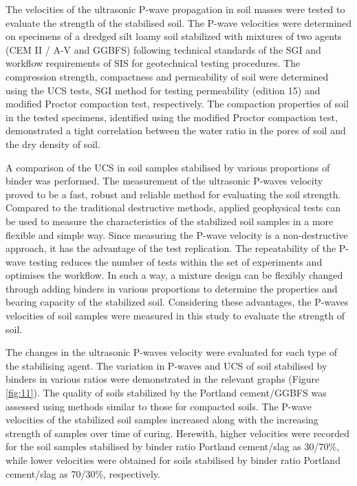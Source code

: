 \documentclass{amestyle}
\begin{document}
The velocities of the ultrasonic P-wave propagation in soil masses were tested to evaluate the strength of the stabilised soil. The P-wave velocities were determined on specimens of a dredged silt loamy soil stabilized with mixtures of two agents (CEM II / A-V and GGBFS) following technical standards of the SGI and workflow requirements of SIS for geotechnical testing procedures. The compression strength, compactness and permeability of soil were determined using the UCS tests, SGI method for testing permeability (edition 15) and modified Proctor compaction test, respectively. The compaction properties of soil in the tested specimens, identified using the modified Proctor compaction test, demonstrated a tight correlation between the water ratio in the pores of soil and the dry density of soil.

A comparison of the UCS in soil samples stabilised by various proportions of binder was performed. The measurement of the ultrasonic P-waves velocity proved to be a fast, robust and reliable method for evaluating the soil strength. Compared to the traditional destructive methods, applied geophysical tests can be used to measure the characteristics of the stabilized soil samples in a more flexible and simple way. Since measuring the P-wave velocity is a non-destructive approach, it has the advantage of the test replication. The repeatability of the P-wave testing reduces the number of tests within the set of experiments and optimises the workflow. In such a way, a mixture design can be flexibly changed through adding binders in various proportions to determine the properties and bearing capacity of the stabilized soil. Considering these advantages, the P-waves velocities of soil samples were measured in this study to evaluate the strength of soil. 

The changes in the ultrasonic P-waves velocity were evaluated for each type of the stabilising agent. The variation in P-waves and UCS of soil stabilised by binders in various ratios were demonstrated in the relevant graphs (Figure \ref{fig:11}). The quality of soils stabilized by the Portland cement/GGBFS was assessed using methods similar to those for compacted soils. The P-wave velocities of the stabilized soil samples increased along with the increasing strength of samples over time of curing. Herewith, higher velocities were recorded for the soil samples stabilised by binder ratio Portland cement/slag as 30/70\%, while lower velocities were obtained for soils stabilised by binder ratio Portland cement/slag as 70/30\%, respectively. 
\end{document}
